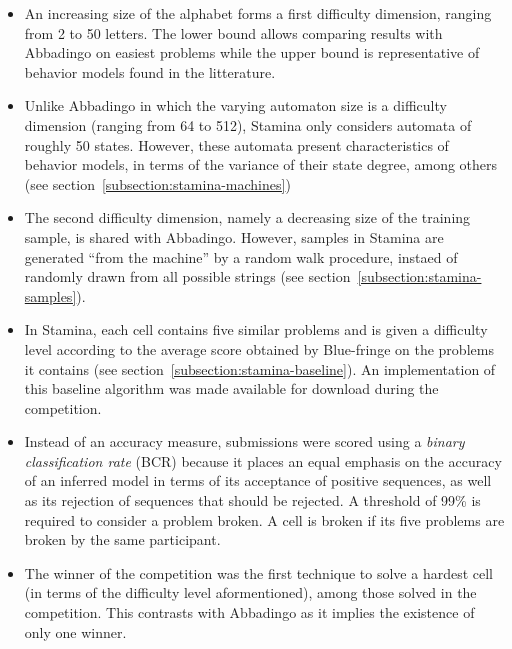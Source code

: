 \begin{itemize}

\item An increasing size of the alphabet forms a first difficulty dimension, ranging from 2 to 50 letters. The lower bound allows comparing results with Abbadingo on easiest problems while the upper bound is representative of behavior models found in the litterature.

\item Unlike Abbadingo in which the varying automaton size is a difficulty dimension (ranging from 64 to 512), Stamina only considers automata of roughly 50 states. However, these automata present characteristics of behavior models, in terms of the variance of their state degree, among others (see section~\ref{subsection:stamina-machines})

\item The second difficulty dimension, namely a decreasing size of the training sample, is shared with Abbadingo. However, samples in Stamina are generated ``from the machine'' by a random walk procedure, instaed of randomly drawn from all possible strings (see section~\ref{subsection:stamina-samples}).

\item In Stamina, each cell contains five similar problems and is given a difficulty level according to the average score obtained by Blue-fringe on the problems it contains (see section~\ref{subsection:stamina-baseline}). An implementation of this baseline algorithm was made available for download during the competition.

\item Instead of an accuracy measure, submissions were scored using a \emph{binary classification rate} (BCR) because it places an equal emphasis on the accuracy of an inferred model in terms of its acceptance of positive sequences, as well as its rejection of sequences that should be rejected. A threshold of 99\% is required to consider a problem broken. A cell is broken if its five problems are broken by the same participant.

\item The winner of the competition was the first technique to solve a hardest cell (in terms of the difficulty level aformentioned), among those solved in the competition. This contrasts with Abbadingo as it implies the existence of only one winner.

\end{itemize}

